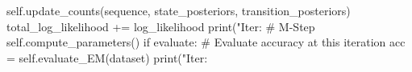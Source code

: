 \begin{exercise}
\begin{python}
                self.update_counts(sequence, state_posteriors, transition_posteriors)
                total_log_likelihood += log_likelihood
            print("Iter: %
            # M-Step
            self.compute_parameters()
            if evaluate:
                # Evaluate accuracy at this iteration
                acc = self.evaluate_EM(dataset)
                print("Iter: %
\end{python}

\end{exercise}


